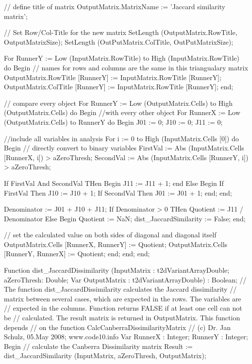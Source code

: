 \documentclass[fleqn,10pt]{SelfArx} %
\begin{document}
  // define title of matrix
  OutputMatrix.MatrixName := 'Jaccard similarity matrix';

   // Set Row/Col-Title for the new matrix
  SetLength (OutputMatrix.RowTitle, OutputMatrixSize);
  SetLength (OutPutMatrix.ColTitle, OutPutMatrixSize);

  For RunnerY := Low (InputMatrix.RowTitle) to High (InputMatrix.RowTitle) do
  Begin
    // names for rows and columns are the same in this triangualary matrix
    OutputMatrix.RowTitle [RunnerY] := InputMatrix.RowTitle [RunnerY];
    OutputMatrix.ColTitle [RunnerY] := InputMatrix.RowTitle [RunnerY];
  end;


  // compare every object
  For RunnerY := Low (OutputMatrix.Cells) to High (OutputMatrix.Cells) do
  Begin
    //with every other object
    For RunnerX := Low (OutputMatrix.Cells) to RunnerY do
    Begin
      J01 := 0;
      J10 := 0;
      J11 := 0;

      //include all variables in analysis
      For i := 0 to High (InputMatrix.Cells [0]) do
      Begin
        // directly convert to binary variables
        FirstVal  := Abs (InputMatrix.Cells [RunnerX, i]) > aZeroThresh;
        SecondVal := Abs (InputMatrix.Cells [RunnerY, i]) > aZeroThresh;

        If FirstVal And SecondVal THen
        Begin
          J11 := J11 + 1;
        end
        Else
        Begin
          If FirstVal Then J10 := J10 + 1;
          If SecondVal Then J01 := J01 + 1;
        end;
      end;

      Denominator := J01 + J10 + J11;
      If Denominator > 0 THen Quotient := J11 / Denominator
                         Else
                         Begin
                           Quotient := NaN;
                           dist_JaccardSimilarity := False;
                         end;

      // set the calculated value on both sides of diagonal and diagonal itself
      OutputMatrix.Cells [RunnerX, RunnerY] := Quotient;
      OutputMatrix.Cells [RunnerY, RunnerX] := Quotient;
    end;
  end;
end;


Function dist_JaccardDissimilarity (InputMatrix : t2dVariantArrayDouble; aZeroThresh: Double; Var OutputMatrix : t2dVariantArrayDouble) : Boolean;
// The function dist_JaccardDissimilarity calculates the Jaccard dissimilarity
// matrix between several cases, which are expected in the rows. The variables are
// expected in the columns. Function returns FALSE if at least one cell can not be
// calculated. The result matrix is returned in OutputMatrix. This function depends
// on the function CalcCanberraDissimilarityMatrix
// (c) Dr. Jan Schulz, 05.May 2008; www.code10.info
Var RunnerX : Integer;
    RunnerY : Integer;
Begin
  // calculate the Canberra Dissimilarity matrix
  Result := dist_JaccardSimilarity (InputMatrix, aZeroThresh, OutputMatrix);
\end{document}
